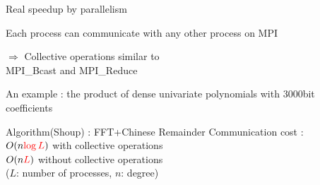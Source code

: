 \documentclass{slides}
\begin{document}
\parskip 3pt
\vskip 2pt

{\color {red} Real speedup by parallelism}

Each process can communicate with any other process on {\color{green} MPI}

$\Rightarrow$ {\color{green} Collective operations} similar to \\
{\color{SeaGreen} MPI\_Bcast} and {\color{SeaGreen} MPI\_Reduce}

\vskip 8pt

{\color{red} An example} :
the product of dense univariate polynomials with 3000bit coefficients

\vskip 8pt
{\color{green} Algorithm}(Shoup) : FFT+Chinese Remainder
\vskip 5pt
{\color{green} Communication cost} :\\
\quad  $O(n{\color{red}\log L})$ with collective operations\\
\quad  $O(n{\color{red}L})$ without collective operations\\
\quad ($L$: number of processes, $n$: degree)

\vskip 5pt

\epsfxsize=17cm

\rightline{ {\color{red} {\tt http://www.openxm.org} }}
\end{document}

